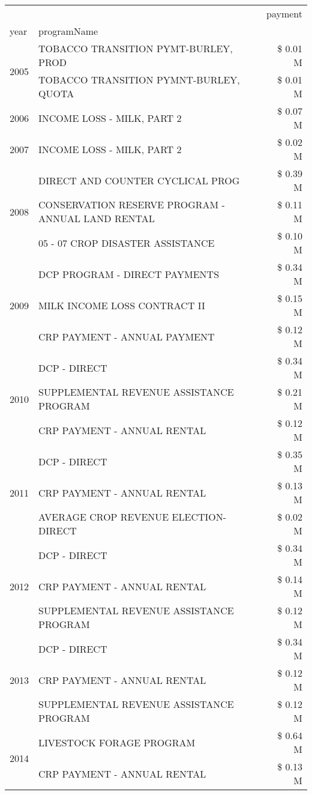 \begin{tabular}{llr}
\toprule
 &  & payment \\
year & programName &  \\
\midrule
\multirow[t]{2}{*}{2005} & TOBACCO TRANSITION PYMT-BURLEY, PROD & \$ 0.01 M \\
 & TOBACCO TRANSITION PYMNT-BURLEY, QUOTA & \$ 0.01 M \\
\cline{1-3}
2006 & INCOME LOSS - MILK, PART 2 & \$ 0.07 M \\
\cline{1-3}
2007 & INCOME LOSS - MILK, PART 2 & \$ 0.02 M \\
\cline{1-3}
\multirow[t]{3}{*}{2008} & DIRECT AND COUNTER CYCLICAL PROG & \$ 0.39 M \\
 & CONSERVATION RESERVE PROGRAM - ANNUAL LAND RENTAL & \$ 0.11 M \\
 & 05 - 07 CROP DISASTER ASSISTANCE & \$ 0.10 M \\
\cline{1-3}
\multirow[t]{3}{*}{2009} & DCP PROGRAM - DIRECT PAYMENTS & \$ 0.34 M \\
 & MILK INCOME LOSS CONTRACT II & \$ 0.15 M \\
 & CRP PAYMENT - ANNUAL PAYMENT & \$ 0.12 M \\
\cline{1-3}
\multirow[t]{3}{*}{2010} & DCP - DIRECT & \$ 0.34 M \\
 & SUPPLEMENTAL REVENUE ASSISTANCE PROGRAM & \$ 0.21 M \\
 & CRP PAYMENT - ANNUAL RENTAL & \$ 0.12 M \\
\cline{1-3}
\multirow[t]{3}{*}{2011} & DCP - DIRECT & \$ 0.35 M \\
 & CRP PAYMENT - ANNUAL RENTAL & \$ 0.13 M \\
 & AVERAGE CROP REVENUE ELECTION-DIRECT & \$ 0.02 M \\
\cline{1-3}
\multirow[t]{3}{*}{2012} & DCP - DIRECT & \$ 0.34 M \\
 & CRP PAYMENT - ANNUAL RENTAL & \$ 0.14 M \\
 & SUPPLEMENTAL REVENUE ASSISTANCE PROGRAM & \$ 0.12 M \\
\cline{1-3}
\multirow[t]{3}{*}{2013} & DCP - DIRECT & \$ 0.34 M \\
 & CRP PAYMENT - ANNUAL RENTAL & \$ 0.12 M \\
 & SUPPLEMENTAL REVENUE ASSISTANCE PROGRAM & \$ 0.12 M \\
\cline{1-3}
\multirow[t]{3}{*}{2014} & LIVESTOCK FORAGE PROGRAM & \$ 0.64 M \\
 & CRP PAYMENT - ANNUAL RENTAL & \$ 0.13 M \\

\end{tabular}
